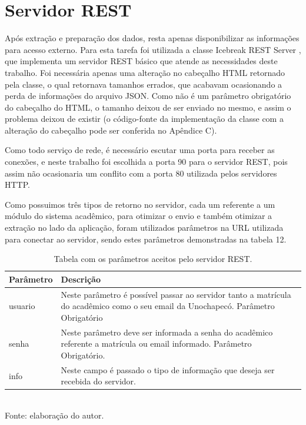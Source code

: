 \section{Servidor REST}
Após extração e preparação dos dados, resta apenas disponibilizar as informações para acesso externo. Para esta tarefa foi utilizada a classe Icebreak REST Server \cite{IcebreakRestServer}, que implementa um servidor REST básico que atende as necessidades deste trabalho. Foi necessária apenas uma alteração no cabeçalho HTML retornado pela classe, o qual retornava tamanhos errados, que acabavam ocasionando a perda de informações do arquivo JSON. Como não é um parâmetro obrigatório do cabeçalho do HTML, o tamanho deixou de ser enviado no mesmo, e assim o problema deixou de existir (o código-fonte da implementação da classe com a alteração do cabeçalho pode ser conferida no Apêndice C). 

Como todo serviço de rede, é necessário escutar uma porta para receber as conexões, e neste trabalho foi escolhida a porta 90 para o servidor REST, pois assim não ocasionaria um conflito com a porta 80 utilizada pelos servidores HTTP.

Como possuimos três tipos de retorno no servidor, cada um referente a um módulo do sistema acadêmico, para otimizar o envio e também otimizar a extração no lado da aplicação, foram utilizados parâmetros na URL utilizada para conectar ao servidor, sendo estes parâmetros demonstradas na tabela 12.

\begin{table}[!hbt]
\centering
\caption[Servidor REST - Parâmetros do Servidor]{Tabela com os parâmetros aceitos pelo servidor REST.}
\vspace{3mm}
\begin{tabular}{p{3cm}|p{9cm}}\hline
\textbf{Parâmetro} & \textbf{Descrição} \\ \hline
usuario            & Neste parâmetro é possível passar ao servidor tanto a matrícula do acadêmico como o seu email da Unochapecó. Parâmetro Obrigatório  \\ \hline
senha              & Neste parâmetro deve ser informada a senha do acadêmico referente a matrícula ou email informado. Parâmetro Obrigatório. \\ \hline
info               & Neste campo é passado o tipo de informação que deseja ser recebida do servidor. \\ \hline
\end{tabular}
\\ Fonte: elaboração do autor.
\end{table}

